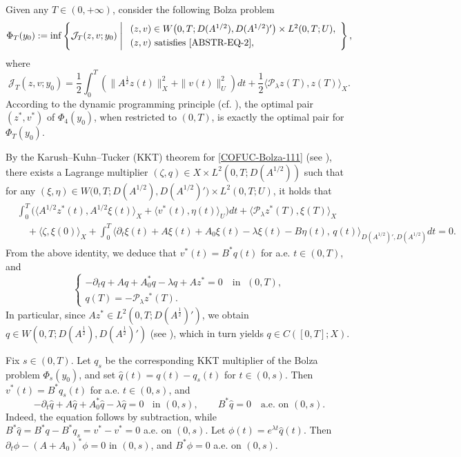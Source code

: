 \documentclass[a4paper]{article}
\numberwithin{equation}{section}
\begin{document}
Given any $T\in (0,+\infty)$, consider the following Bolza problem
\begin{equation}\label{COFUC-Bolza-111}
\Phi_T(y_0):= {\inf}\left\{\mathcal J_T(z,v;y_0)\;\middle|\;
\begin{array}{l}
(z,v)\in W\big(0,T;D(A^{1/2}),D(A^{1/2})'\big)\times L^2(0,T;U),\\[1mm]
(z,v) \text{ satisfies \eqref{ABSTR-EQ-2}},
\end{array}\right\},
\end{equation}
where
\begin{equation}\label{Bolza-FUNCAL-111}
\mathcal J_T(z,v;y_0)=\frac12\int_0^T\left(\|A^{\frac 12}z(t)\|_{X}^2+\|v(t)\|_{U}^2\right)dt+\frac12\langle\mathcal P_\lambda z(T),z(T)\rangle_X.
\end{equation}
According to the dynamic programming principle (cf. \cite[Lemma 3.10]{BR}), the optimal pair $(z^*,v^*)$ of $\Phi_4(y_0)$, when restricted to $(0,T)$, is exactly the optimal pair for $\Phi_T(y_0)$.

By the Karush--Kuhn--Tucker (KKT) theorem for \eqref{COFUC-Bolza-111} (see \cite[Theorem A.1]{BR}), there exists a Lagrange multiplier $(\zeta,q)\in X\times L^2(0,T;D(A^{1/2}))$ such that for any $(\xi,\eta)\in  W\big(0,T;D(A^{1/2}),D(A^{1/2})'\big)\times L^2(0,T;U)$, it holds that
$$\begin{aligned}
&\int_0^T \big(\langle A^{1/2}z^*(t),A^{1/2}\xi(t)\rangle_X+\langle v^*(t),\eta(t)\rangle_U\big)dt
+\langle \mathcal P_\lambda z^*(T),\xi(T)\rangle_X \\
&\quad+\langle \zeta,\xi(0)\rangle_X
+\int_0^T\big\langle \partial_t\xi(t)+A\xi(t)+A_0\xi(t)-\lambda\xi(t)-B\eta(t),\,q(t)\big\rangle_{D(A^{1/2})',D(A^{1/2})}dt=0.
\end{aligned}$$
From the above identity, we deduce that $v^*(t) = B^* q(t)$ for a.e. $t\in (0,T)$, and
$$\begin{cases}
-\partial_t q + Aq + A_0^* q - \lambda q + A z^* = 0\quad \text{in } \;(0,T),\\[4pt]
q(T) = -\mathcal P_\lambda z^*(T).
\end{cases}$$
In particular, since $Az^*\in L^2(0,T;D(A^{\frac 12})')$, we obtain $q\in W(0,T;D(A^{\frac 12}),D(A^{\frac 12})')$ (see \cite{LM}), which in turn yields $q\in C([0,T];X)$.

Fix $s\in(0,T)$. Let $q_s$ be the corresponding KKT multiplier of the Bolza problem $\Phi_s(y_0)$, and set $\widehat q(t)=q(t)-q_s(t)$ for $t\in(0,s)$. Then $v^*(t)=B^*q_s(t)$ for a.e. $t\in(0,s)$, and
$$-\partial_t\widehat q+A\widehat q+A_0^*\widehat q-\lambda\widehat q=0\;\;\text{ in }(0,s),\qquad B^*\widehat q=0\quad\text{a.e. on }(0,s).$$
Indeed, the equation follows by subtraction, while $B^*\widehat q=B^*q-B^*q_s=v^*-v^*=0$ a.e. on $(0,s)$. Let $\phi(t)=e^{\lambda t}\widehat q(t)$. Then $\partial_t\phi-(A+A_0)^*\phi=0$ in $(0,s)$, and $B^*\phi=0$ a.e. on $(0,s)$. 
\end{document}
